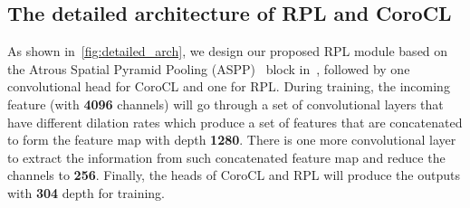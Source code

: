 \documentclass[10pt,twocolumn,letterpaper]{article}
\begin{document}
\subsection{The detailed architecture of RPL and CoroCL}
As shown in~\cref{fig:detailed_arch}, we design our proposed RPL module based on the Atrous Spatial Pyramid Pooling (ASPP)~\cite{chen2018encoder,chen2017rethinking} block in~\cite{zhu2019improving}, followed by one convolutional head for CoroCL and one for RPL. During training, the incoming feature (with \textbf{4096} channels) will go through a set of convolutional layers that have different dilation rates which produce a set of features that are concatenated to form the feature map with depth \textbf{1280}. There is one more convolutional layer to extract the information from such concatenated feature map and reduce the channels to \textbf{256}. Finally, the heads of CoroCL and RPL will produce the outputs with \textbf{304} depth for training.
\end{document}

